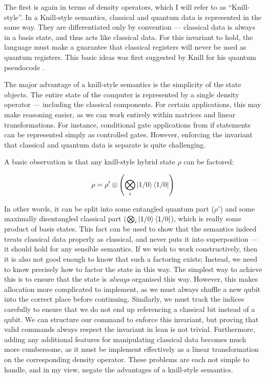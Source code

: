 The first is again in terms of density operators, which I will refer to as ``Knill-style''.
% 
In a Knill-style semantics, classical and quantum data is represented in the same way.
% 
They are differentiated only by convention --- classical data is always in a basis state, and thus acts like classical data.
% 
For this invariant to hold, the language must make a guarantee that classical registers will never be used as quantum registers.
% 
This basic ideas was first suggested by Knill for his quantum pseudocode \cite{Knill_1996_Pseudocode}.


The major advantage of a knill-style semantics is the simplicity of the state objects.
% 
The entire state of the computer is represented by a single density operator --- including the classical components.
% 
For certain applications, this may make reasoning easier, as we can work entirely within matrices and linear transformations.
% 
For instance, conditional gate applications from if statements can be represented simply as controlled gates.
% 
However, enforcing the invariant that classical and quantum data is separate is quite challenging. 


A basic observation is that any knill-style hybrid state $\rho$ can be factored:

$$
\rho = \rho' \otimes \left(\bigotimes_i \ket{1/0}\bra{1/0}\right)
$$

\noindent In other words, it can be split into some entangled quantum part ($\rho'$) and some maximally disentangled classical part ($\bigotimes_i \ket{1/0} \bra{1/0}$),
which is really some product of basis states.
% 
This fact can be used to show that the semantics indeed treats classical data properly as classical, and never puts it into superposition ---
it should hold for any sensible semantics.
% 
If we wish to work constructively, then it is also not good enough to know that such a factoring exists;
Instead, we need to know precisely how to factor the state in this way.
%  
The simplest way to achieve this is to ensure that the state is \emph{always} organised this way.
% 
However, this makes allocation more complicated to implement, as we must always shuffle a new qubit into the correct place before continuing.
% 
Similarly, we must track the indices carefully to ensure that we do not end up referencing a classical bit instead of a qubit.
% 
We can structure our command to enforce this invariant, but proving that valid commands always respect the invariant in lean is not trivial.
% 
Furthermore, adding any additional features for manipulating classical data becomes much more cumbersome,
as it must be implement effectively as a linear transformation on the corresponding density operator.
% 
These problems are each not simple to handle, and in my view, negate the advantages of a knill-style semantics.


